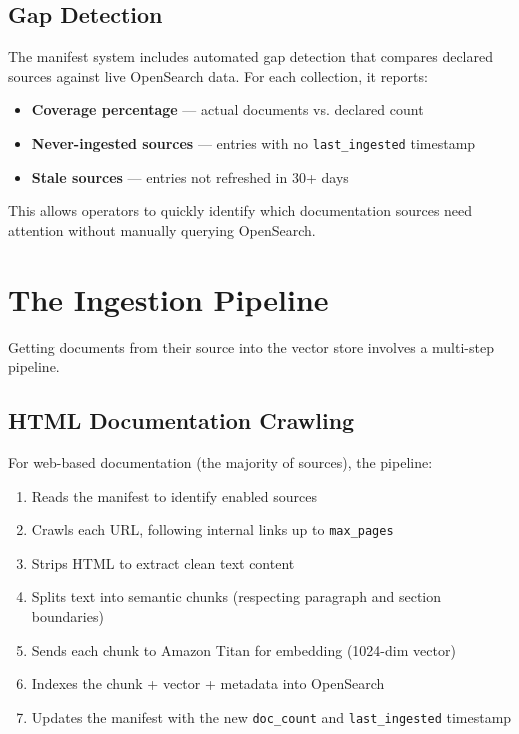 \documentclass[11pt,letterpaper]{article}
\begin{document}
\subsection{Gap Detection}

The manifest system includes automated gap detection that compares
declared sources against live OpenSearch data. For each collection, it
reports:

\begin{itemize}[nosep]
    \item \textbf{Coverage percentage} — actual documents vs. declared
    count
    \item \textbf{Never-ingested sources} — entries with no
    \texttt{last\_ingested} timestamp
    \item \textbf{Stale sources} — entries not refreshed in 30+ days
\end{itemize}

This allows operators to quickly identify which documentation sources
need attention without manually querying OpenSearch.

\section{The Ingestion Pipeline}

Getting documents from their source into the vector store involves a
multi-step pipeline.

\subsection{HTML Documentation Crawling}

For web-based documentation (the majority of sources), the pipeline:

\begin{enumerate}[nosep]
    \item Reads the manifest to identify enabled sources
    \item Crawls each URL, following internal links up to
    \texttt{max\_pages}
    \item Strips HTML to extract clean text content
    \item Splits text into semantic chunks (respecting paragraph and
    section boundaries)
    \item Sends each chunk to Amazon Titan for embedding (1024-dim
    vector)
    \item Indexes the chunk + vector + metadata into OpenSearch
    \item Updates the manifest with the new \texttt{doc\_count} and
    \texttt{last\_ingested} timestamp
\end{enumerate}
\end{document}
